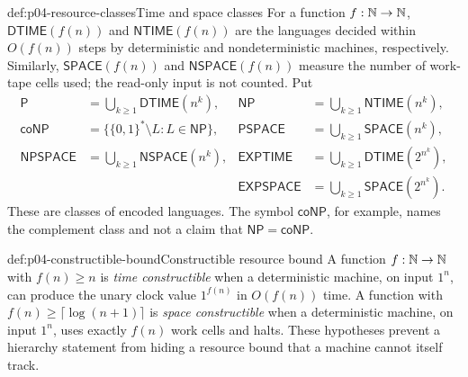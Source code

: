 \begin{hbdefinition}{def:p04-resource-classes}{Time and space classes}
For a function \(f:\mathbb{N}\to\mathbb{N}\), \(\mathsf{DTIME}(f(n))\) and
\(\mathsf{NTIME}(f(n))\) are the languages decided within \(O(f(n))\) steps
by deterministic and nondeterministic machines, respectively.
Similarly, \(\mathsf{SPACE}(f(n))\) and \(\mathsf{NSPACE}(f(n))\) measure the
number of work-tape cells used; the read-only input is not counted.  Put
\[
\begin{aligned}
 \mathsf P&=\bigcup_{k\geq1}\mathsf{DTIME}(n^k),&
 \mathsf{NP}&=\bigcup_{k\geq1}\mathsf{NTIME}(n^k),\\
 \mathsf{coNP}&=\{\{0,1\}^*\setminus L:L\in\mathsf{NP}\},&
 \mathsf{PSPACE}&=\bigcup_{k\geq1}\mathsf{SPACE}(n^k),\\
 \mathsf{NPSPACE}&=\bigcup_{k\geq1}\mathsf{NSPACE}(n^k),&
 \mathsf{EXPTIME}&=\bigcup_{k\geq1}\mathsf{DTIME}(2^{n^k}),\\
 &&\mathsf{EXPSPACE}&=\bigcup_{k\geq1}\mathsf{SPACE}(2^{n^k}).
\end{aligned}
\]
These are classes of encoded languages.  The symbol \(\mathsf{coNP}\), for
example, names the complement class and not a claim that
\(\mathsf{NP}=\mathsf{coNP}\).
\end{hbdefinition}

\begin{hbdefinition}{def:p04-constructible-bound}{Constructible resource bound}
A function \(f:\mathbb{N}\to\mathbb{N}\) with \(f(n)\geq n\) is \emph{time constructible} when a deterministic
machine, on input \(1^n\), can produce the unary clock value \(1^{f(n)}\) in
\(O(f(n))\) time.  A function with
\(f(n)\geq\lceil\log(n+1)\rceil\) is \emph{space constructible} when a deterministic
machine, on input \(1^n\), uses exactly \(f(n)\) work cells and halts.  These
hypotheses prevent a hierarchy statement from hiding a resource bound that a
machine cannot itself track.
\end{hbdefinition}

